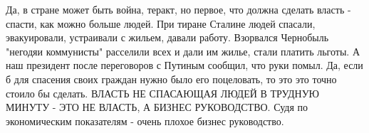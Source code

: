 Да, в стране может быть война, теракт, но первое, что должна сделать власть -
спасти, как можно больше людей. При тиране Сталине людей спасали, эвакуировали,
устраивали с жильем, давали работу. Взорвался Чернобыль "негодяи коммунисты"
расселили всех и дали им жилье, стали платить льготы. А наш президент после
переговоров с Путиным сообщил, что руки помыл. Да, если б для спасения своих
граждан нужно было его поцеловать, то это это точно стоило бы сделать. ВЛАСТЬ
НЕ СПАСАЮЩАЯ ЛЮДЕЙ В ТРУДНУЮ МИНУТУ - ЭТО НЕ ВЛАСТЬ, А БИЗНЕС РУКОВОДСТВО. Судя
по экономическим показателям - очень плохое бизнес руководство.

